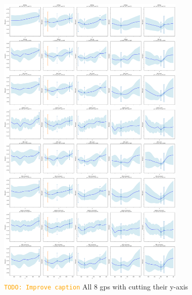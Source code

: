 \documentclass{ucdgradtaughtthesis}
\newcommand{\todo}[1]{\textcolor{orange}{\texttt{TODO: #1}}}
\begin{document}
\begin{figure}[H]
    \centering
    \includegraphics[width=0.8\textwidth]{LatexPlots/final_gps_plots/final_gps_ycuts.png}
    \caption{\todo{Improve caption} All 8 gps with cutting their y-axis}
    \label{fig:best8_ycuts}
\end{figure}
\end{document}
